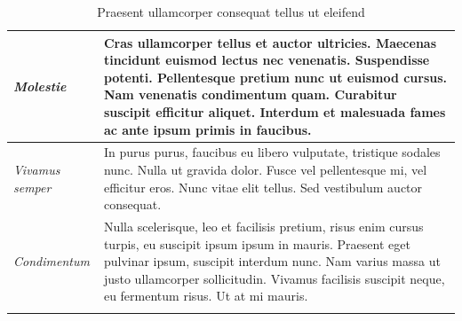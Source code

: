 \begin{center}
\begin{longtable}{ | p{} | p{} | }
			\emph{Molestie}
			& Cras ullamcorper tellus et auctor ultricies. Maecenas tincidunt euismod lectus nec venenatis. Suspendisse potenti. Pellentesque pretium nunc ut euismod cursus. Nam venenatis condimentum quam. Curabitur suscipit efficitur aliquet. Interdum et malesuada fames ac ante ipsum primis in faucibus.
			\\ \hline
			
			\emph{Vivamus semper}
			& In purus purus, faucibus eu libero vulputate, tristique sodales nunc. Nulla ut gravida dolor. Fusce vel pellentesque mi, vel efficitur eros. Nunc vitae elit tellus. Sed vestibulum auctor consequat. 
			\\ \hline
			
			\emph{Condimentum}
			& Nulla scelerisque, leo et facilisis pretium, risus enim cursus turpis, eu suscipit ipsum ipsum in mauris. Praesent eget pulvinar ipsum, suscipit interdum nunc. Nam varius massa ut justo ullamcorper sollicitudin. Vivamus facilisis suscipit neque, eu fermentum risus. Ut at mi mauris.
			\\ \hline
			
			\caption{Praesent ullamcorper consequat tellus ut eleifend}
			\label{tab:example-3}		
		\end{longtable}
	\end{center}
\fi